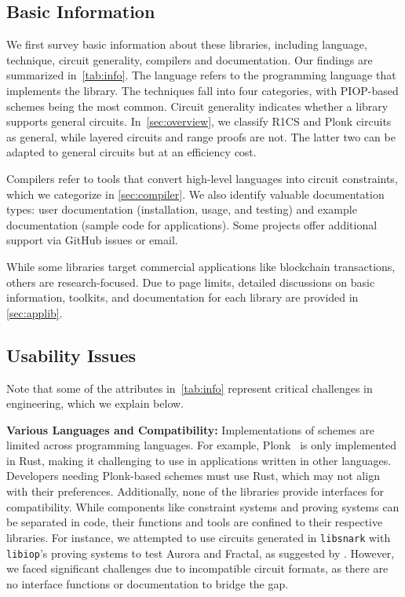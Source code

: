\documentclass[letterpaper,twocolumn,10pt]{article}
\theoremstyle{definition}
\newcommand{\mypara}[1]{\noindent\textbf{{#1: }}}
\newcommand{\zk}{\text{zk-SNARK}\xspace}
\newcommand{\new}[1]{{#1}\xspace}
\newcommand{\news}[1]{{#1}\xspace}
\newcommand{\lib}[1]{\texttt{#1}\xspace}
\begin{document}
\subsection{Basic Information}

We first survey basic information about these libraries, including language, technique, circuit generality, compilers and documentation. Our findings are summarized in~\autoref{tab:info}. The language refers to the programming language that implements the library. The techniques fall into four categories, with PIOP-based schemes being the most common. Circuit generality indicates whether a library supports general circuits. In~\autoref{sec:overview}, we classify R1CS and Plonk circuits as general, while layered circuits and range proofs are not. The latter two can be adapted to general circuits but at an efficiency cost.

Compilers refer to tools that convert high-level languages into circuit constraints, which we categorize in \autoref{sec:compiler}. We also identify valuable documentation types: user documentation (installation, usage, and testing) and example documentation (sample code for applications). Some projects offer additional support via GitHub issues or email.

While some libraries target commercial applications like blockchain transactions, others are research-focused. \news{Due to page limits, detailed discussions on basic information, toolkits, and documentation for each library are provided in \autoref{sec:applib}.}

\subsection{Usability Issues}
Note that some of the attributes in~\autoref{tab:info} represent critical challenges in engineering, which we explain below.

\mypara{Various Languages and Compatibility}Implementations of \zk schemes are limited across programming languages. For example, Plonk~\cite{gabizon2019plonk} is only implemented in Rust, making it challenging to use in applications written in other languages. Developers needing Plonk-based schemes must use Rust, which may not align with their preferences.
\new{Additionally, none of the libraries provide interfaces for compatibility. While components like constraint systems and proving systems can be separated in code, their functions and tools are confined to their respective libraries. For instance, we attempted to use circuits generated in \lib{libsnark} with \lib{libiop}'s proving systems to test Aurora and Fractal, as suggested by \cite{libiop-issue}. However, we faced significant challenges due to incompatible circuit formats, as there are no interface functions or documentation to bridge the gap.}
\end{document}
